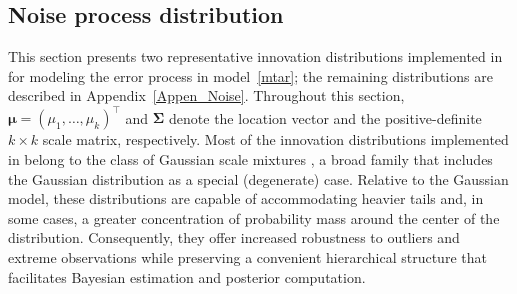 \subsection{Noise process distribution}\label{npd}
This section presents two representative innovation distributions implemented in  for modeling the error process in model~\eqref{mtar}; the remaining distributions are described in Appendix~\ref{Appen_Noise}. Throughout this section, $\bm{\mu}=(\mu_1,\ldots,\mu_k)^{\!\top}$ and $\bm{\Sigma}$ denote the location vector and the positive-definite $k\times k$ scale matrix, respectively. Most of the innovation distributions implemented in  belong to the class of Gaussian scale mixtures \citep[section 6.2]{MFE05}, a broad family that includes the Gaussian distribution as a special (degenerate) case. Relative to the Gaussian model, these distributions are capable of accommodating heavier tails and, in some cases, a greater concentration of probability mass around the center of the distribution. Consequently, they offer increased robustness to outliers and extreme observations while preserving a convenient hierarchical structure that facilitates Bayesian estimation and posterior computation.


